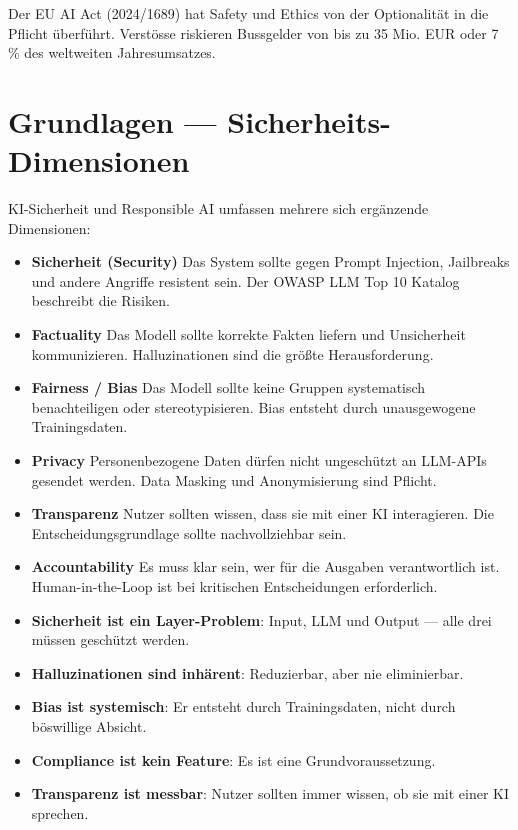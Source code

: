 Der EU AI Act (2024/1689) hat Safety und Ethics von der Optionalität in die Pflicht überführt. Verstösse riskieren Bussgelder von bis zu 35 Mio. EUR oder 7\,\% des weltweiten Jahresumsatzes.

\section{Grundlagen --- Sicherheits-Dimensionen}

KI-Sicherheit und Responsible AI umfassen mehrere sich ergänzende Dimensionen:

\begin{itemize}

     \item \textbf{Sicherheit (Security)} Das System sollte gegen Prompt Injection, Jailbreaks und andere Angriffe resistent sein. Der OWASP LLM Top 10 Katalog beschreibt die Risiken.
     \item \textbf{Factuality} Das Modell sollte korrekte Fakten liefern und Unsicherheit kommunizieren. Halluzinationen sind die größte Herausforderung.
     \item \textbf{Fairness / Bias} Das Modell sollte keine Gruppen systematisch benachteiligen oder stereotypisieren. Bias entsteht durch unausgewogene Trainingsdaten.
     \item \textbf{Privacy} Personenbezogene Daten dürfen nicht ungeschützt an LLM-APIs gesendet werden. Data Masking und Anonymisierung sind Pflicht.
     \item \textbf{Transparenz} Nutzer sollten wissen, dass sie mit einer KI interagieren. Die Entscheidungsgrundlage sollte nachvollziehbar sein.
     \item \textbf{Accountability} Es muss klar sein, wer für die Ausgaben verantwortlich ist. Human-in-the-Loop ist bei kritischen Entscheidungen erforderlich.
\end{itemize}




\par\mbox{}\par
\begin{merkeEnv}
\begin{itemize}
     \item \textbf{Sicherheit ist ein Layer-Problem}: Input, LLM und Output --- alle drei müssen geschützt werden.
     \item \textbf{Halluzinationen sind inhärent}: Reduzierbar, aber nie eliminierbar.
     \item \textbf{Bias ist systemisch}: Er entsteht durch Trainingsdaten, nicht durch böswillige Absicht.
     \item \textbf{Compliance ist kein Feature}: Es ist eine Grundvoraussetzung.
     \item \textbf{Transparenz ist messbar}: Nutzer sollten immer wissen, ob sie mit einer KI sprechen.
\end{itemize}
\end{merkeEnv}

